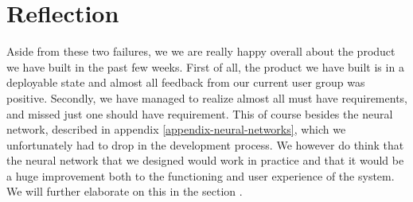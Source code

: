 \section{Reflection}
Aside from these two failures, we we are really happy overall about the product we have built in the past few weeks.
First of all, the product we have built is in a deployable state and almost all feedback from our current user group was positive.
Secondly, we have managed to realize almost all must have requirements, and missed just one should have requirement.
This of course besides the neural network, described in appendix \ref{appendix-neural-networks}, which we unfortunately had to drop in the development process.
We however do think that the neural network that we designed would work in practice and that it would be a huge improvement both to the functioning and user experience of the system.
We will further elaborate on this in the section .

